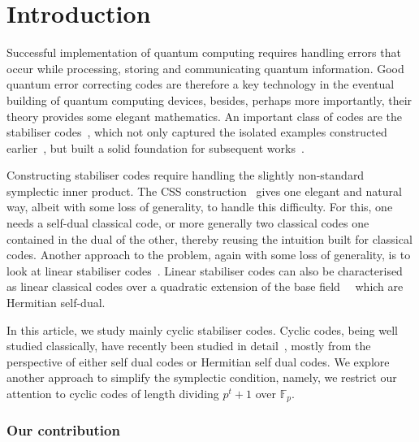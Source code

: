 \documentclass[conference]{IEEEtran}
\renewcommand{\=}{\approx}
\begin{document}
\section{Introduction}

Successful implementation of quantum computing requires handling
errors that occur while processing, storing and communicating quantum
information. Good quantum error correcting codes are therefore a key
technology in the eventual building of quantum computing devices,
besides, perhaps more importantly, their theory provides some elegant
mathematics. An important class of codes are the stabiliser
codes~\cite{gottesman:1996:error}, which not only captured the
isolated examples constructed
earlier~\cite{Sho95,Ste96a,BDSW96,LMPZ96}, but built a solid
foundation for subsequent
works~\cite{calderbank98quantum,Ashikhmin2000nonbinary,arvind2003family}.

Constructing stabiliser codes require handling the slightly
non-standard symplectic inner product. The CSS
construction~\cite{calderbank96css,steane96css} gives one elegant and
natural way, albeit with some loss of generality, to handle this
difficulty. For this, one needs a self-dual classical code, or
more generally two classical codes one contained in the dual of the
other, thereby reusing the intuition built for classical codes.
Another approach to the problem, again with some loss of generality,
is to look at linear stabiliser
codes~\cite{calderbank98quantum}. Linear stabiliser codes can also be
characterised as linear classical codes over a quadratic extension of
the base field~\cite[Theorem 3]{calderbank98quantum}~\cite[Lemma
18]{ketkar2005nonbinary} which are Hermitian self-dual.

In this article, we study mainly cyclic stabiliser codes. Cyclic
codes, being well studied classically, have recently been studied in
detail~\cite{calderbank98quantum,thangaraj2001quantumcyclic,salah2006quantumBCH,ketkar2005nonbinary},
mostly from the perspective of either self dual codes or Hermitian
self dual codes. We explore another approach to simplify the
symplectic condition, namely, we restrict our attention to cyclic
codes of length dividing $p^t +1$ over $\mathbb{F}_p$.


\subsubsection*{Our contribution}
\end{document}
